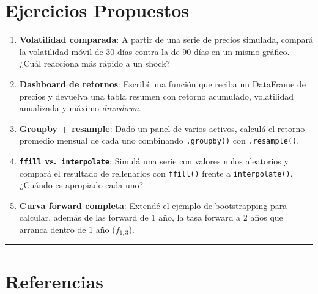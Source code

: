 \documentclass[
  spanish,
  letterpaper,
  DIV=11,
  numbers=noendperiod]{scrreprt}
\providecommand{\tightlist}{%
  \setlength{\itemsep}{0pt}\setlength{\parskip}{0pt}}
\begin{document}
\section{Ejercicios Propuestos}\label{ejercicios-propuestos-5}

\begin{tcolorbox}[enhanced jigsaw, bottomrule=.15mm, colback=white, opacitybacktitle=0.6, arc=.35mm, toprule=.15mm, opacityback=0, breakable, titlerule=0mm, left=2mm, coltitle=black, colbacktitle=quarto-callout-important-color!10!white, colframe=quarto-callout-important-color-frame, leftrule=.75mm, toptitle=1mm, bottomtitle=1mm, title=\textcolor{quarto-callout-important-color}{\faExclamation}\hspace{0.5em}{Desafíos}, rightrule=.15mm]

\begin{enumerate}
\def\labelenumi{\arabic{enumi}.}
\tightlist
\item
  \textbf{Volatilidad comparada}: A partir de una serie de precios
  simulada, compará la volatilidad móvil de 30 días contra la de 90 días
  en un mismo gráfico. ¿Cuál reacciona más rápido a un shock?
\item
  \textbf{Dashboard de retornos}: Escribí una función que reciba un
  DataFrame de precios y devuelva una tabla resumen con retorno
  acumulado, volatilidad anualizada y máximo \emph{drawdown}.
\item
  \textbf{Groupby + resample}: Dado un panel de varios activos, calculá
  el retorno promedio mensual de cada uno combinando \texttt{.groupby()}
  con \texttt{.resample()}.
\item
  \textbf{\texttt{ffill} vs.~\texttt{interpolate}}: Simulá una serie con
  valores nulos aleatorios y compará el resultado de rellenarlos con
  \texttt{ffill()} frente a \texttt{interpolate()}. ¿Cuándo es apropiado
  cada uno?
\item
  \textbf{Curva forward completa}: Extendé el ejemplo de bootstrapping
  para calcular, además de las forward de 1 año, la tasa forward a 2
  años que arranca dentro de 1 año (\(f_{1,3}\)).
\end{enumerate}

\end{tcolorbox}

\begin{center}\rule{0.5\linewidth}{0.5pt}\end{center}

\section{Referencias}\label{referencias-5}
\end{document}
